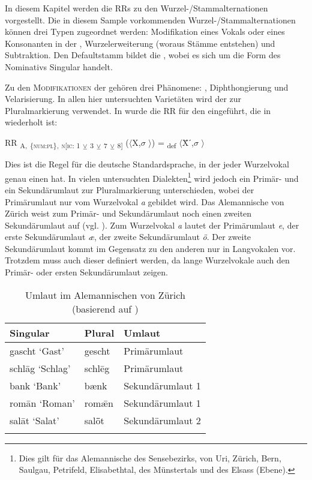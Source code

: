 In diesem Kapitel werden die RRs zu den Wur\-zel-/Stamm\-al\-ter\-na\-tio\-nen vorgestellt. Die in diesem Sample vorkommenden Wur\-zel-/Stamm\-al\-ter\-na\-tio\-nen können drei Typen zugeordnet werden: Modifikation eines Vokals oder eines Konsonanten in der , Wurzelerweiterung (woraus Stämme entstehen) und Subtraktion. Den Defaultstamm bildet die , wobei es sich um die Form des Nominativs Singular handelt.

Zu den \textsc{Modifikationen} der  gehören drei Phänomene: , Diphthongierung und Velarisierung. In allen hier untersuchten Varietäten wird der  zur Pluralmarkierung verwendet. In  wurde die RR für den  eingeführt, die in  wiederholt ist:

\begin{exe}
 RR \textsubscript{A,} \textsubscript{\{\textsc{num:pl}\},} \textsubscript{\textsc{n[}\textsc{ic:} 1} \textsubscript{\tiny $\veebar$}\textsubscript{ 3} \textsubscript{\tiny $\veebar$}\textsubscript{ 7} \textsubscript{\tiny $\veebar$}\textsubscript{ 8]} ($\langle$X,$\sigma$ $\rangle$) = \textsubscript{def} $\langle$Ẍˊ,$\sigma$ $\rangle$
\end{exe}

Dies ist die Regel für die deutsche Standardsprache, in der jeder Wurzelvokal genau einen  hat. In vielen untersuchten Dialekten\footnote{Dies gilt für das Alemannische des Sensebezirks, von Uri, Zürich, Bern, Saulgau, Petrifeld, Elisabethtal, des Münstertals und des Elsass (Ebene).} wird jedoch ein Primär- und ein Sekundärumlaut zur Pluralmarkierung unterschieden, wobei der Primärumlaut nur vom Wurzelvokal \textit{a} gebildet wird. Das Alemannische von Zürich weist zum Primär- und Sekundärumlaut noch einen zweiten Sekundärumlaut auf (vgl. ). Zum Wurzelvokal \textit{a} lautet der Primärumlaut \textit{e}, der erste Sekundärumlaut \textit{æ}, der zweite Sekundärumlaut \textit{ö}. Der zweite Sekundärumlaut kommt im Gegensatz zu den anderen nur in Langvokalen vor. Trotzdem muss auch dieser definiert werden, da lange Wurzelvokale auch den Primär- oder ersten Sekundärumlaut zeigen.


\begin{table}
\caption{Umlaut im Alemannischen von Zürich (basierend auf \citealt[111-119]{Weber1987})}\label{table5.1}
\begin{tabular}{lll}
\lsptoprule
{Singular} & {Plural} & {Umlaut}\\
\midrule
gascht ‘Gast’ & gescht & Primärumlaut\\
schl\=ag ‘Schlag’ & schl\=eg & Primärumlaut\\
bank ‘Bank’ & bænk & Sekundärumlaut 1\\
rom\=an ‘Roman’ & romǣn & Sekundärumlaut 1\\
sal\=at ‘Salat’ & salȫt & Sekundärumlaut 2\\
\lspbottomrule
\end{tabular}
\end{table}

